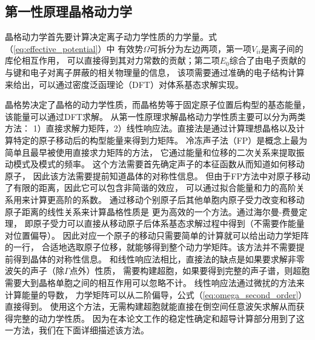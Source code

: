 




\subsection{第一性原理晶格动力学}
晶格动力学首先要计算决定离子动力学性质的力学量。式（\ref{eq:effective_potential}）中
有效势$\Omega$可拆分为左边两项，第一项$V_{ii}$是离子间的库伦相互作用，
可以直接得到其对力常数的贡献；第二项$E_0$综合了由电子贡献的与键和电子对离子屏蔽的相关物理量的信息，
该项需要通过准确的电子结构计算来给出，可以通过密度泛函理论（DFT）对体系基态求解实现。

晶格势决定了晶格的动力学性质，而晶格势等于固定原子位置后构型的基态能量，该能量可以通过DFT求解。
从第一性原理求解晶格动力学性质主要可以分为两类方法\cite{fritsch1999density}：
1）直接求解力矩阵，2）线性响应法。直接法是通过计算理想晶格以及计算特定的原子移动后的构型能量来得到力矩阵。
冷冻声子法（FP）是概念上最为简单且最早被使用直接求力矩阵的方法，
它通过能量和位移的二次关系来提取振动模式及模式的频率\cite{yin1980microscopic}。
这个方法需要首先确定声子的本征函数从而知道如何移动原子，
因此该方法需要提前知道晶体的对称性信息。
但由于FP方法中对原子移动了有限的距离，因此它可以包含非简谐的效应，
可以通过拟合能量和力的高阶关系用来计算更高阶的系数。
通过移动个别原子后其他单胞内原子受力改变和移动原子距离的线性关系来计算晶格性质是
更为高效的一个方法。通过海尔曼-费曼定理，
即原子受力可以直接从移动原子后体系基态求解过程中得到（不需要作能量对位置偏导）。
因此对应一个原子的移动只需要简单的计算就可以给出动力学矩阵的一行，
合适地选取原子位移，就能够得到整个动力学矩阵。该方法并不需要提前得到晶体的对称性信息。
和线性响应法相比，直接法的缺点是如果要求解非零波矢的声子（除$\Gamma$点外）性质，
需要构建超胞，如果要得到完整的声子谱，则超胞需要大到晶格单胞之间的相互作用可以忽略不计\cite{frank1995ab,kresse1995ab}。
线性响应法通过微扰的方法来计算能量的导数，
力学矩阵可以从二阶偏导，公式（\ref{eq:omega_second_order}）直接得到。
使用这个方法，无需构建超胞就能直接在倒空间任意波矢求解从而获得完整的动力学性质\cite{baroni2001phonons}。
因为在本论文工作的稳定性确定和超导计算部分用到了这一方法，我们在下面详细描述该方法。

